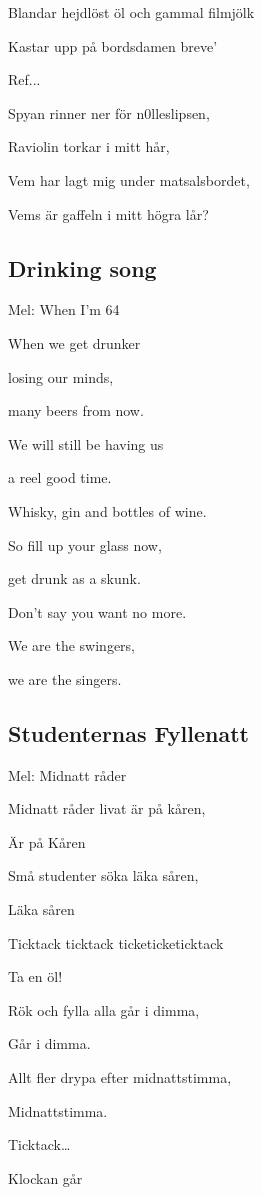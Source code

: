 Blandar hejdlöst öl och gammal filmjölk

Kastar upp på bordsdamen breve’\bigskip

Ref...\bigskip

Spyan rinner ner för n0lleslipsen,

Raviolin torkar i mitt hår,

Vem har lagt mig under matsalsbordet,

Vems är gaffeln i mitt högra lår? \bigskip

\subsection{\textbf{Drinking song}} 

Mel: When I'm 64\bigskip

When we get drunker

losing our minds,

many beers from now.

We will still be having us

a reel good time.

Whisky, gin and bottles of wine.

So fill up your glass now,

get drunk as a skunk.

Don’t say you want no more.\bigskip

We are the swingers,

we are the singers. \bigskip

\subsection{\textbf{Studenternas Fyllenatt}}

Mel: Midnatt råder\bigskip


Midnatt råder livat är på kåren,

Är på Kåren

Små studenter söka läka såren,

Läka såren

Ticktack ticktack ticketicketicktack

Ta en öl!\bigskip

Rök och fylla alla går i dimma,

Går i dimma.

Allt fler drypa efter midnattstimma,

Midnattstimma.

Ticktack…

Klockan går\bigskip

